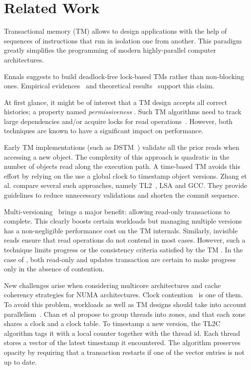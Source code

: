 \section{Related Work}

Transactional memory (TM) allows to design applications with the help of sequences of instructions that run in isolation one from another.
This paradigm greatly simplifies the programming of modern highly-parallel computer architectures.

Ennals \cite{emals} suggests to build deadlock-free lock-based TMs rather than non-blocking ones.
Empirical evidences~\cite{dice06} and theoretical results~\cite{Guerraoui:2008,KuznetsovR15} support this claim.

At first glance, it might be of interest that a TM design accepts all correct histories; a property named \emph{permissiveness} \cite{guerraoui08}.
Such TM algorithms need to track large dependencies \cite{Keidar:2009} and/or acquire locks for read operations~\cite{attiya2012single}.
However, both techniques are known to have a significant impact on performance.

Early TM implementations (such as DSTM~\cite{herlihy2003software}) validate all the prior reads when accessing a new object.
The complexity of this approach is quadratic in the number of objects read along the execution path.
A time-based TM avoids this effort by relying on the use a global clock to timestamp object versions.
Zhang et al. \cite{zhang2008commit} compare several such approaches, namely TL2~\cite{dice2006transactional}, LSA \cite{riegel2006lazy} and GCC\cite{spear2006conflict}.
They provide guidelines to reduce unnecessary validations and shorten the commit sequence.

Multi-versioning~\cite{Fernandes:2011, Diegues:2014} brings a major benefit: allowing read-only transactions to complete.
This clearly boosts certain workloads but managing multiple versions has a non-negligible performance cost on the TM internals.
Similarly, invisible reads ensure that read operations do not contend in most cases.
However, such a technique limits progress or the consistency criteria satisfied by the TM \cite{Attiya:2009}.
In the case of , both read-only and updates transaction are certain to make progress only in the absence of contention.

New challenges arise when considering multicore architectures and cache coherency strategies for NUMA architectures.
Clock contention~\cite{6121290} is one of them.
To avoid this problem, workloads as well as TM designs should take into account parallelism~\cite{Nguyen:2017}.
Chan et al \cite{6121290} propose to group threads into zones, and that each zone shares a clock and a clock table.
To timestamp a new version, the TL2C algorithm \cite{Avni:2008} tags it with a local counter together with the thread id.
Each thread stores a vector of the latest timestamp it encountered.
The algorithm preserves opacity by requiring that a transaction restarts if one of the vector entries is not up to date.

